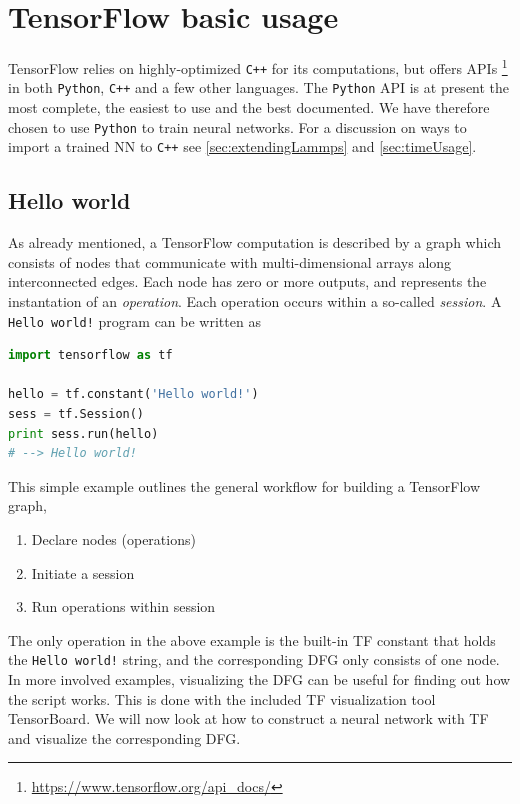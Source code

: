 \documentclass[twoside,english]{uiofysmaster}
\begin{document}
\section{TensorFlow basic usage}
TensorFlow relies on highly-optimized
\texttt{C++} for its computations, but offers
APIs \footnote{\href{https://www.tensorflow.org/api_docs/}
{https://www.tensorflow.org/api\_docs/}}
in both \texttt{Python},
\texttt{C++} and a few other languages. 
The \texttt{Python} API is at present the most
complete, the easiest to use and the best documented.
We have therefore chosen to use \texttt{Python}
to train neural networks. For a discussion
on ways to import a trained NN to \texttt{C++} see
\autoref{sec:extendingLammps}
and \autoref{sec:timeUsage}. 

\subsection{Hello world}
As already mentioned, a TensorFlow computation
is described by a graph which consists of nodes
that communicate with multi-dimensional arrays along
interconnected edges. Each node has zero or more
outputs, and represents the instantation
of an \textit{operation}. Each operation
occurs within a so-called \textit{session}. 
A \texttt{Hello world!} program can be written as
\begin{lstlisting}[language=python]
import tensorflow as tf

hello = tf.constant('Hello world!')
sess = tf.Session()
print sess.run(hello)
# --> Hello world!
\end{lstlisting}
This simple example outlines the general
workflow for building a TensorFlow graph,
\begin{enumerate}
 \item Declare nodes (operations)
 \item Initiate a session
 \item Run operations within session
\end{enumerate}
The only operation in the above example
is the built-in TF constant that holds the 
\texttt{Hello world!} string, and the 
corresponding DFG only consists of one node. 
In more involved examples, visualizing 
the DFG can be useful for finding out how 
the script works. This is done with the 
included TF visualization tool TensorBoard.
We will now look at how to construct a neural network with TF and
visualize the corresponding DFG. 
\end{document}
